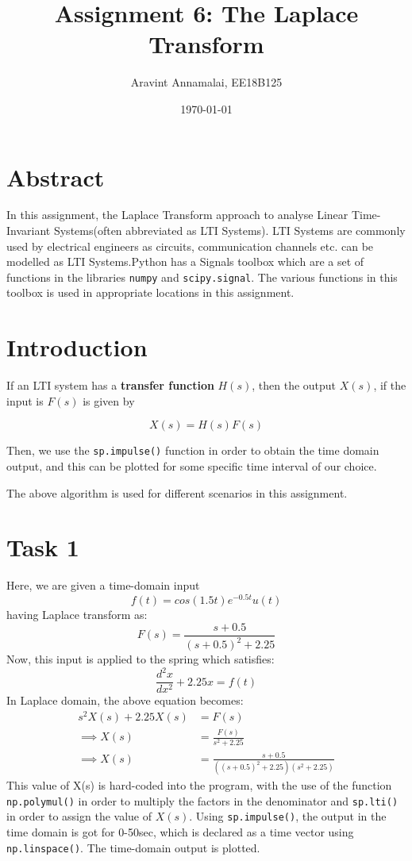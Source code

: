 \documentclass[11pt, a4paper]{article}
\title{Assignment 6: The Laplace Transform} %
\author{Aravint Annamalai, EE18B125} %
\date{\today} %
\begin{document}
		
		
\maketitle %

\section{Abstract}
In this assignment, the Laplace Transform approach to analyse Linear Time-Invariant Systems(often abbreviated as LTI Systems). LTI Systems are commonly used by electrical engineers as circuits, communication channels etc. can be modelled as LTI Systems.Python has a Signals toolbox which are a set of functions in the libraries \texttt{numpy} and \texttt{scipy.signal}. The various functions in this toolbox is used in appropriate locations in this assignment.

\section{Introduction}
If an LTI system has a \textbf{transfer function} \(H(s)\), then the output \(X(s)\), if the input is \(F(s)\) is given by

\[ X(s) = H(s)F(s)\]

Then, we use the \texttt{sp.impulse()} function in order to obtain the time domain output, and this can be plotted for some specific time interval of our choice. 

The above algorithm is used for different scenarios in this assignment.

\section{Task 1}
Here, we are given a time-domain input
\begin{equation*}
 f(t) = cos(1.5t)e^{-0.5t}u(t)
\end{equation*}
having Laplace transform as:
\begin{equation*}
F(s) = \frac{s + 0.5}{(s+0.5)^2 + 2.25}
\end{equation*}
Now, this input is applied to the spring which satisfies:
\begin{equation*}
\frac{d^2x}{dx^2} + 2.25x = f(t)
\end{equation*}
In Laplace domain, the above equation becomes:
\begin{equation*}
\begin{split}
s^2X(s) + 2.25X(s) &= F(s)
\\ \implies X(s) &= \frac{F(s)}{s^2 + 2.25}
\\ \implies X(s) &= \frac{s + 0.5}{((s+0.5)^2 + 2.25)(s^2 + 2.25)}
\end{split}
\end{equation*}
This value of X(s) is hard-coded into the program, with the use of the function \texttt{np.polymul()} in order to multiply the factors in the denominator and \texttt{sp.lti()} in order to assign the value of \(X(s)\). Using \texttt{sp.impulse()}, the output in the time domain is got for 0-50sec, which is declared as a time vector using \texttt{np.linspace()}. The time-domain output is plotted.
\end{document}
